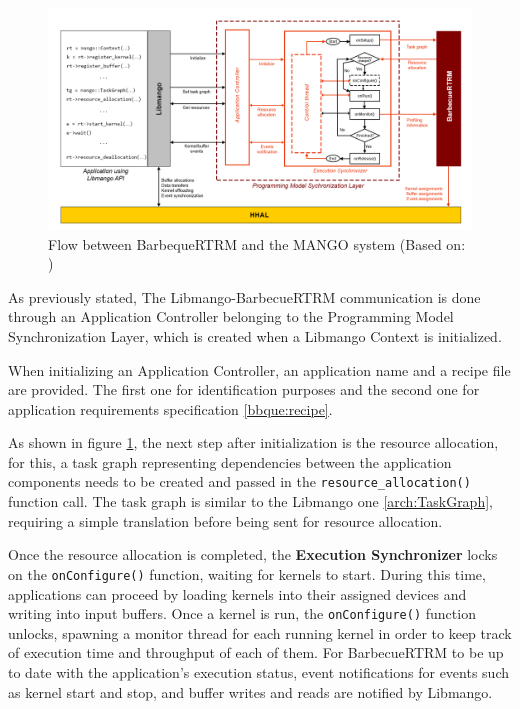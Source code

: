 \begin{figure}[ht]
    \centering
    \includegraphics[width=\textwidth]{img/barbeque-flow.png}
    \captionsetup{justification=centering}
    \caption{Flow between BarbequeRTRM and the MANGO system (Based on: \cite{mango_exploring_manycore_architectures})}
    \label{fig:barbecue-flow}
\end{figure}

As previously stated, The Libmango-BarbecueRTRM communication is done through an Application Controller belonging to the Programming Model Synchronization Layer, which is created when a Libmango Context is initialized.

When initializing an Application Controller, an application name and a recipe file are provided. The first one for identification purposes and the second one for application requirements specification \ref{bbque:recipe}.

As shown in figure \ref{fig:barbecue-flow}, the next step after initialization is the resource allocation, for this, a task graph representing dependencies between the application components needs to be created and passed in the \texttt{resource\_allocation()} function call. The task graph is similar to the Libmango one \ref{arch:TaskGraph}, requiring a simple translation before being sent for resource allocation. 

Once the resource allocation is completed, the \textbf{Execution Synchronizer} locks on the \texttt{onConfigure()} function, waiting for kernels to start. During this time, applications can proceed by loading kernels into their assigned devices and writing into input buffers. Once a kernel is run, the \texttt{onConfigure()} function unlocks, spawning a monitor thread for each running kernel in order to keep track of execution time and throughput of each of them. 
For BarbecueRTRM to be up to date with the application's execution status, event notifications for events such as kernel start and stop, and buffer writes and reads are notified by Libmango.

